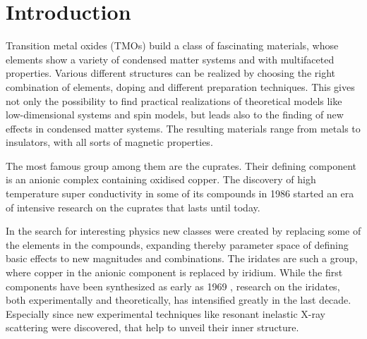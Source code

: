 \chapter{Introduction}


Transition metal oxides (TMOs) build a class of fascinating materials, whose elements 
show a  variety of  condensed matter systems and with multifaceted properties.
Various different structures  can be realized  by choosing the right combination of elements, doping and different preparation techniques.
This gives not only the possibility to find practical realizations of theoretical  models like low-dimensional systems and spin models,
but leads also to the finding of new effects in condensed matter systems.
The resulting materials range from metals to insulators, with all sorts of magnetic properties. 





The most famous group among them are the cuprates. 
Their defining component is an anionic complex containing oxidised copper. 
The discovery of high temperature super conductivity in some of its compounds in 1986 \cite{cuprateHTSC} 
started an era of intensive research on the cuprates that lasts until today.

In the search for interesting physics new classes were created by replacing some of the elements in the compounds, 
expanding thereby parameter space of defining basic effects to new magnitudes  and combinations.
The iridates are such a group, where copper in the anionic component is replaced by iridium. 
While the first components have been synthesized as early as 1969 \cite{Longo1969191},
research  on the iridates, both experimentally and theoretically, has intensified greatly in the last decade.
Especially since new experimental techniques like resonant  inelastic X-ray scattering were discovered, that help to unveil their inner structure.








%



